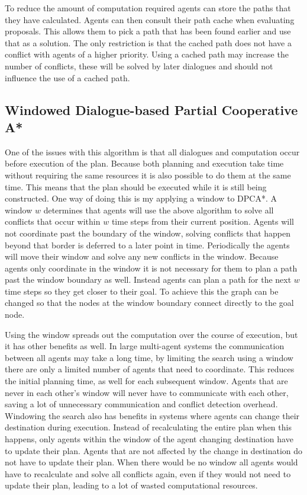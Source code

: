 To reduce the amount of computation required agents can store the paths that
they have calculated. Agents can then consult their path cache when evaluating
proposals. This allows them to pick a path that has been found earlier and use
that as a solution. The only restriction is that the cached path does not have
a conflict with agents of a higher priority. Using a cached path may increase 
the number of conflicts, these will be solved by later dialogues and should not 
influence the use of a cached path.

\subsection{Windowed Dialogue-based Partial Cooperative A*}
One of the issues with this algorithm is that all dialogues and computation
occur before execution of the plan. Because both planning and execution take
time without requiring the same resources it is also possible to do them at the
same time. This means that the plan should be executed while it is still being
constructed. One way of doing this is my applying a window to DPCA*. A
window $w$ determines that agents will use the above algorithm to solve all
conflicts that occur within $w$ time steps from their current position. Agents
will not coordinate past the boundary of the window, solving conflicts that
happen beyond that border is deferred to a later point in time. Periodically
the agents will move their window and solve any new conflicts in the window.
Because agents only coordinate in the window it is not necessary for them to
plan a path past the window boundary as well. Instead agents can plan a path
for the next $w$ time steps so they get closer to their goal. To achieve this
the graph can be changed so that the nodes at the window boundary connect
directly to the goal node.

Using the window spreads out the computation over the course of execution, but
it has other benefits as well. In large multi-agent systems the communication
between all agents may take a long time, by limiting the search using a window
there are only a limited number of agents that need to coordinate. This reduces
the initial planning time, as well for each subsequent window. Agents that are
never in each other's window will never have to communicate with each other,
saving a lot of unnecessary communication and conflict detection overhead.
Windowing the search also has benefits in systems where agents can change their
destination during execution. Instead of recalculating the entire plan when
this happens, only agents within the window of the agent changing destination
have to update their plan. Agents that are not affected by the change in
destination do not have to update their plan. When there would be no window all
agents would have to recalculate and solve all conflicts again, even if they
would not need to update their plan, leading to a lot of wasted computational
resources.